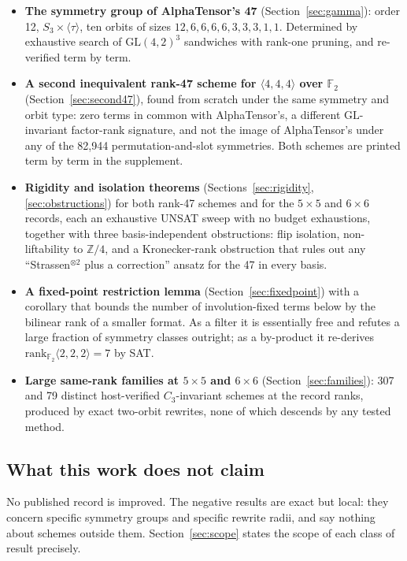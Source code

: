 \documentclass[11pt]{article}
\newcommand{\FF}{\mathbb{F}_2}
\newcommand{\tw}[3]{\langle #1,#2,#3\rangle}
\newcommand{\GL}{\mathrm{GL}}
\begin{document}
\begin{itemize}
\item \textbf{The symmetry group of AlphaTensor's 47} (Section~\ref{sec:gamma}): order 12, $S_3\times
\langle\tau\rangle$, ten orbits of sizes $12,6,6,6,6,3,3,3,1,1$. Determined by exhaustive search of
$\GL(4,2)^3$ sandwiches with rank-one pruning, and re-verified term by term.
\item \textbf{A second inequivalent rank-47 scheme for $\tw444$ over $\FF$}
(Section~\ref{sec:second47}), found from scratch under the same symmetry and orbit type: zero terms in
common with AlphaTensor's, a different $\GL$-invariant factor-rank signature, and not the image of
AlphaTensor's under any of the 82{,}944 permutation-and-slot symmetries. Both schemes are printed term
by term in the supplement.
\item \textbf{Rigidity and isolation theorems} (Sections~\ref{sec:rigidity}, \ref{sec:obstructions}) for
both rank-47 schemes and for the $5\times5$ and $6\times6$ records, each an exhaustive UNSAT sweep with
no budget exhaustions, together with three basis-independent obstructions: flip isolation, non-liftability
to $\mathbb{Z}/4$, and a Kronecker-rank obstruction that rules out any ``Strassen$^{\otimes2}$ plus a
correction'' ansatz for the 47 in every basis.
\item \textbf{A fixed-point restriction lemma} (Section~\ref{sec:fixedpoint}) with a corollary that
bounds the number of involution-fixed terms below by the bilinear rank of a smaller format. As a filter it
is essentially free and refutes a large fraction of symmetry classes outright; as a by-product it
re-derives $\mathrm{rank}_{\FF}\tw222 = 7$ by SAT.
\item \textbf{Large same-rank families at $5\times5$ and $6\times6$} (Section~\ref{sec:families}): 307
and 79 distinct host-verified $C_3$-invariant schemes at the record ranks, produced by exact two-orbit
rewrites, none of which descends by any tested method.
\end{itemize}

\subsection{What this work does not claim}

No published record is improved. The negative results are exact but local: they concern specific symmetry
groups and specific rewrite radii, and say nothing about schemes outside them. Section~\ref{sec:scope}
states the scope of each class of result precisely.
\end{document}
